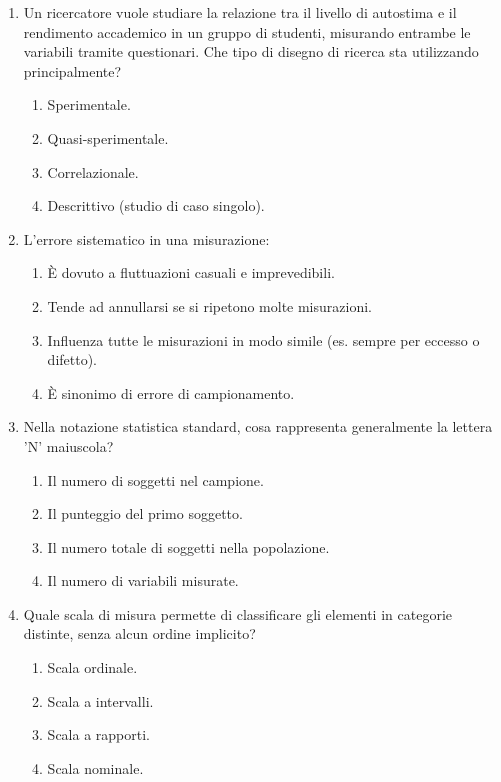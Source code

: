 \documentclass[12pt, a4paper]{article}
\begin{document}
\begin{enumerate}
    \item Un ricercatore vuole studiare la relazione tra il livello di autostima e il rendimento accademico in un gruppo di studenti, misurando entrambe le variabili tramite questionari. Che tipo di disegno di ricerca sta utilizzando principalmente?
    \begin{enumerate}
        \item Sperimentale.
        \item Quasi-sperimentale.
        \item Correlazionale.
        \item Descrittivo (studio di caso singolo).
    \end{enumerate}

    \item L'errore sistematico in una misurazione:
    \begin{enumerate}
        \item È dovuto a fluttuazioni casuali e imprevedibili.
        \item Tende ad annullarsi se si ripetono molte misurazioni.
        \item Influenza tutte le misurazioni in modo simile (es. sempre per eccesso o difetto).
        \item È sinonimo di errore di campionamento.
    \end{enumerate}

    \item Nella notazione statistica standard, cosa rappresenta generalmente la lettera 'N' maiuscola?
    \begin{enumerate}
        \item Il numero di soggetti nel campione.
        \item Il punteggio del primo soggetto.
        \item Il numero totale di soggetti nella popolazione.
        \item Il numero di variabili misurate.
    \end{enumerate}

    \item Quale scala di misura permette di classificare gli elementi in categorie distinte, senza alcun ordine implicito?
    \begin{enumerate}
        \item Scala ordinale.
        \item Scala a intervalli.
        \item Scala a rapporti.
        \item Scala nominale.
    \end{enumerate}


\end{enumerate}
\end{document}

